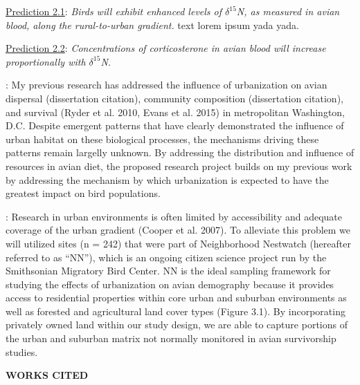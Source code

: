 \documentclass[12pt]{article}
\begin{document}

\noindent \underline{Prediction 2.1}: \textit{Birds will exhibit enhanced levels of $\delta^{15}$N, as measured in avian blood, along the rural-to-urban gradient.} 
text lorem ipsum yada yada. \par


\noindent \underline{Prediction 2.2}: \textit{Concentrations of corticosterone in avian blood will increase proportionally with $\delta^{15}$N.} \par \par



: 
My previous research has addressed the influence of urbanization on avian dispersal (dissertation citation), community composition (dissertation citation), and survival (Ryder et al. 2010, Evans et al. 2015) in metropolitan Washington, D.C. Despite emergent patterns that have clearly demonstrated the influence of urban habitat on these biological processes, the mechanisms driving these patterns remain largelly unknown. By addressing the distribution and influence of resources in avian diet, the proposed research project builds on my previous work by addressing the mechanism by which urbanization is expected to have the greatest impact on bird populations.


:
Research in urban environments is often limited by accessibility and adequate coverage of the urban gradient (Cooper et al. 2007). To alleviate this problem we will utilized sites (n = 242) that were part of Neighborhood Nestwatch (hereafter referred to as “NN”), which is an ongoing citizen science project run by the Smithsonian Migratory Bird Center. NN is the ideal sampling framework for studying the effects of urbanization on avian demography because it provides access to residential properties within core urban and suburban environments as well as forested and agricultural land cover types (Figure 3.1). By incorporating privately owned land within our study design, we are able to capture portions of the urban and suburban matrix not normally monitored in avian survivorship studies.

\noindent \begin{center} {\textbf {WORKS CITED}}\end{center} \par
\end{document}
